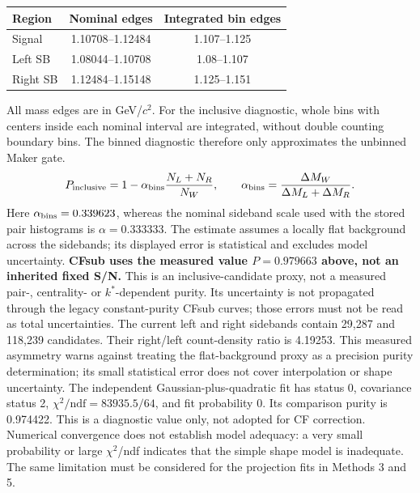 \documentclass[11pt,a4paper]{article}
\begin{document}
\begin{center}\begin{tabular}{lcc}\hline Region & Nominal edges & Integrated bin edges\\\hline
Signal & 1.10708--1.12484 & 1.107--1.125\\
Left SB & 1.08044--1.10708 & 1.08--1.107\\
Right SB & 1.12484--1.15148 & 1.125--1.151\\
\hline\end{tabular}\end{center}
All mass edges are in GeV/$c^2$. For the inclusive diagnostic, whole bins with centers inside each nominal interval are integrated, without double counting boundary bins. The binned diagnostic therefore only approximates the unbinned Maker gate.
\begin{equation}P_{\rm inclusive}=1-\alpha_{\rm bins}\frac{N_L+N_R}{N_W},\qquad \alpha_{\rm bins}=\frac{\Delta M_W}{\Delta M_L+\Delta M_R}.\end{equation}
Here $\alpha_{\rm bins}=0.339623$, whereas the nominal sideband scale used with the stored pair histograms is $\alpha=0.333333$. The estimate assumes a locally flat background across the sidebands; its displayed error is statistical and excludes model uncertainty.
\textbf{CFsub uses the measured value $P=0.979663$ above, not an inherited fixed S/N.} This is an inclusive-candidate proxy, not a measured pair-, centrality- or $k^*$-dependent purity. Its uncertainty is not propagated through the legacy constant-purity CFsub curves; those errors must not be read as total uncertainties.
The current left and right sidebands contain 29,287 and 118,239 candidates. Their right/left count-density ratio is 4.19253. This measured asymmetry warns against treating the flat-background proxy as a precision purity determination; its small statistical error does not cover interpolation or shape uncertainty.
The independent Gaussian-plus-quadratic fit has status 0, covariance status 2, $\chi^2/\mathrm{ndf}=83935.5/64$, and fit probability 0. Its comparison purity is 0.974422. This is a diagnostic value only, not adopted for CF correction. Numerical convergence does not establish model adequacy: a very small probability or large $\chi^2$/ndf indicates that the simple shape model is inadequate. The same limitation must be considered for the projection fits in Methods 3 and 5.
\end{document}
